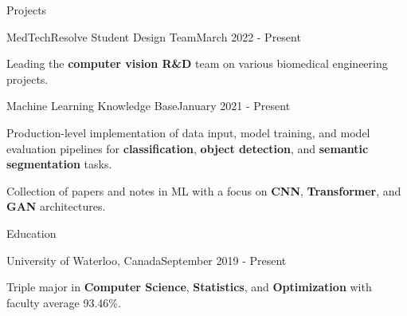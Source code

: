 \documentclass{resume}
\begin{document}
\begin{rSection}{Projects}

    \begin{rSubsection}{MedTechResolve Student Design Team}{March 2022 - Present}{}{}
        \item Leading the \textbf{computer vision R\&D} team on various biomedical engineering projects.
    \end{rSubsection}

    \begin{rSubsection}{Machine Learning Knowledge Base}{January 2021 - Present}{}{}
        \item \href{https://github.com/danielmao2019/Computer-Vision-TensorFlow}{\faGithub}
        Production-level implementation of data input, model training, and model evaluation pipelines for
        \textbf{classification}, \textbf{object detection}, and \textbf{semantic segmentation} tasks.
        \item \href{https://github.com/danielmao2019/Machine-Learning-Knowledge-Base}{\faGithub}
        Collection of papers and notes in ML with a focus on \textbf{CNN}, \textbf{Transformer}, and \textbf{GAN} architectures.
    \end{rSubsection}

\end{rSection}

\begin{rSection}{Education}

    \begin{rSubsection}{University of Waterloo, Canada}{September 2019 - Present}{}{}
        \item Triple major in \textbf{Computer Science}, \textbf{Statistics}, and \textbf{Optimization} with faculty average 93.46\%.
    \end{rSubsection}

\end{rSection}
\end{document}
